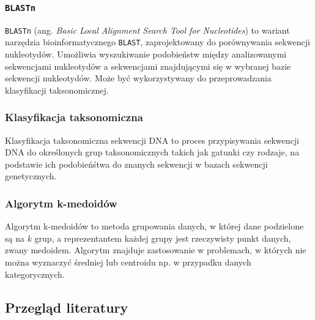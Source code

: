         \subsubsection{\texttt{BLASTn}}

            \texttt{BLASTn} (ang. \textit{Basic Local Alignment Search Tool for Nucleotides}) to wariant narzędzia bioinformatycznego \texttt{BLAST}, zaprojektowany do porównywania sekwencji nukleotydów. Umożliwia wyszukiwanie podobieństw między analizowanymi sekwencjami nukleotydów a sekwencjami znajdującymi się w wybranej bazie sekwencji nukleotydów. Może być wykorzystywany do przeprowadzania klasyfikacji taksonomicznej.

        \subsubsection{Klasyfikacja taksonomiczna}

            Klasyfikacja taksonomiczna sekwencji DNA to proces przypisywania sekwencji DNA do określonych grup taksonomicznych takich jak gatunki czy rodzaje, na podstawie ich podobieńśtwa do znanych sekwencji w bazach sekwencji genetycznych.

        \subsubsection{Algorytm k-medoidów}

            Algorytm k-medoidów to metoda grupowania danych, w której dane podzielone są na $k$ grup, a reprezentantem każdej grupy jest rzeczywisty punkt danych, zwany medoidem. Algorytm znajduje zastosowanie w problemach, w których nie można wyznaczyć średniej lub centroidu np. w przypadku danych kategorycznych.

            \subsection{Przegląd literatury}




